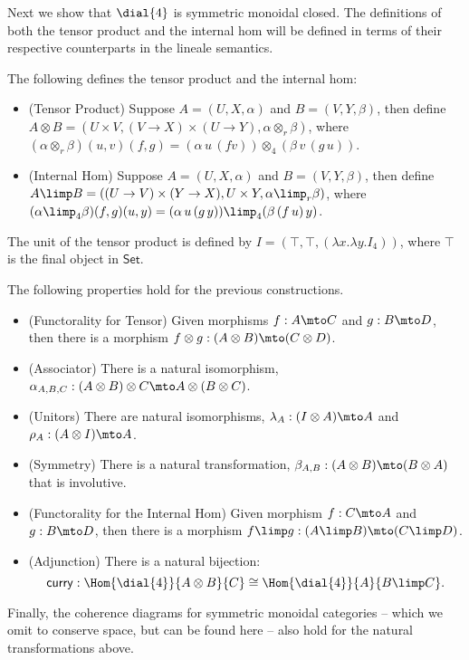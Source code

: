 Next we show that $\dial{4}$ is symmetric monoidal closed.  The
definitions of both the tensor product and the internal hom will be
defined in terms of their respective counterparts in the lineale
semantics.
\begin{definition}
  \label{def:dialectica-model-smcc}
  The following defines the tensor product and the internal hom:
  \begin{itemize}
  \item[] (Tensor Product) Suppose $A = (U , X , \alpha)$ and $B = (V, Y, \beta)$, then
    define $A \otimes B = (U \times V, (V \to X) \times (U \to Y), \alpha \otimes_r \beta)$, where
    $(\alpha \otimes_r \beta)(u, v)(f, g) = (\alpha\,u\,(f v)) \otimes_4 (\beta\,v\,(g\,u))$.\\[-5px]

  \item[] (Internal Hom) Suppose $A = (U , X , \alpha)$ and $B = (V, Y, \beta)$, then
    define $A \limp B = ((U \to V) \times (Y \to X), U \times Y, \alpha \limp_r \beta)$, where
    $(\alpha \limp_4 \beta)(f , g)(u , y) = (\alpha\,u\,(g\,y)) \limp_4 (\beta\,(f\,u)\,y)$.
  \end{itemize}
  The unit of the tensor product is defined by $I = (\top, \top,
  (\lambda x.\lambda y.I_4))$, where $\top$ is the final object in
  $\mathsf{Set}$.
\end{definition}
The following properties hold for the previous constructions.
\begin{lemma}
  \label{lemma:smcc_properties_for_dial4}
  \begin{itemize}
  \item[] (Functorality for Tensor) Given morphisms $f : A \mto C$ and
    $g : B \mto D$, then there is a morphism $f \otimes g : (A \otimes B) \mto (C \otimes D)$.\\[-5px]
  \item[] (Associator) There is a natural isomorphism, $\alpha_{A,B,C} : (A \otimes B) \otimes C \mto A \otimes (B \otimes C)$.\\[-5px]
  \item[] (Unitors) There are natural isomorphisms, $\lambda_A : (I \otimes A) \mto A$ and $\rho_A : (A \otimes I) \mto A$.\\[-5px]
  \item[] (Symmetry) There is a natural transformation, $\beta_{A,B} : (A \otimes B) \mto (B \otimes A)$ that is involutive.\\[-5px]
  \item[] (Functorality for the Internal Hom) Given morphism $f : C \mto A$ and $g : B \mto D$, then there is a morphism $f \limp g : (A \limp B) \mto (C \limp D)$.\\[-5px]
  \item[] (Adjunction) There is a natural bijection:\vspace{-5px}
    \[ \mathsf{curry} : \Hom{\dial{4}}{A \otimes B}{C} \cong \Hom{\dial{4}}{A}{B \limp C}. \]
  \end{itemize}
  Finally, the coherence diagrams for symmetric monoidal categories --
  which we omit to conserve space, but can be found here
  \cite{MacLane:1971} -- also hold for the natural transformations
  above.
\end{lemma}
